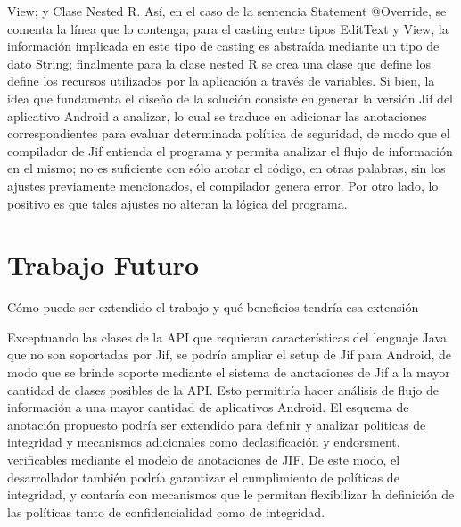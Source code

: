 View; y Clase Nested R. Así, en el caso de  la sentencia Statement @Override, se
comenta la línea que lo contenga; para el casting entre tipos EditText y View,
la información implicada en este tipo de casting es abstraída mediante un tipo
de dato String; finalmente para la clase nested R se crea una clase que define
los define los recursos utilizados por la aplicación a través de
variables.\newline 
Si bien, la idea que fundamenta el diseño de la solución consiste en generar la
versión Jif del aplicativo Android a analizar, lo cual se traduce en adicionar
las anotaciones correspondientes para evaluar determinada política de seguridad,
de modo que el compilador de Jif entienda el programa y permita analizar el
flujo de información en el mismo; no es suficiente con sólo anotar el código, en
otras palabras, sin los ajustes previamente mencionados, el compilador genera
error. Por otro lado, lo positivo es que tales ajustes no alteran la lógica del
programa.


\section{Trabajo Futuro}
Cómo puede ser extendido el trabajo y qué beneficios tendría esa
extensión\newline

Exceptuando las clases de la API que requieran características del lenguaje Java
que no son soportadas por Jif, se podría ampliar el setup de Jif para Android,
de modo que se brinde soporte mediante el sistema de anotaciones de Jif a la
mayor cantidad de clases posibles de la API. Esto permitiría hacer análisis de
flujo de información a una mayor cantidad de aplicativos Android.\newline
El esquema de anotación propuesto podría ser extendido para definir y analizar
políticas de integridad y mecanismos adicionales como declasificación y
endorsment, verificables mediante el modelo de anotaciones de JIF. De este modo,
el desarrollador también podría garantizar el cumplimiento de políticas de
integridad, y contaría con mecanismos que le permitan flexibilizar la definición
de las políticas tanto de confidencialidad como de integridad.



